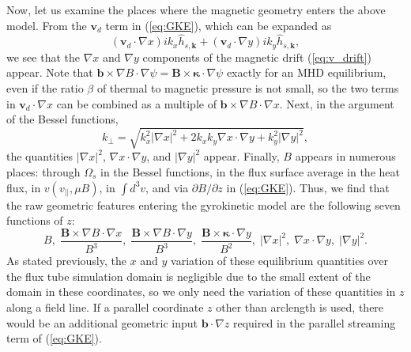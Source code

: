 \documentclass{jpp}
\begin{document}
Now, let us examine the places where the magnetic geometry enters the above model.
From the $\mathbf{v}_d$ term in (\ref{eq:GKE}), which can be expanded as
\begin{equation}
    \left(\mathbf{v}_d \cdot\nabla x \right) i k_x \hat{h}_{s,\mathbf{k}}
    + \left(\mathbf{v}_d \cdot\nabla y \right) i k_y \hat{h}_{s,\mathbf{k}},
\end{equation}
we see that the $\nabla x$ and $\nabla y$ components of the magnetic drift (\ref{eq:v_drift}) appear.
Note that $\mathbf{b}\times\nabla B\cdot\nabla\psi = \mathbf{B}\times\mathbf{\kappa}\cdot\nabla\psi$ exactly for an MHD equilibrium, even if the ratio $\beta$ of thermal to magnetic pressure is not small, so the two terms in $\mathbf{v}_d\cdot\nabla x$ can be combined as a multiple of $\mathbf{b}\times\nabla B\cdot\nabla x$.
Next, in the argument of the Bessel functions,
\begin{equation}
    k_\perp = \sqrt{k_x^2 |\nabla x|^2 + 2k_x k_y \nabla x\cdot\nabla y + k_y^2 |\nabla y|^2},
\end{equation}
the quantities $|\nabla x|^2$, $\nabla x\cdot\nabla y$, and $|\nabla y|^2$ appear.
Finally, $B$ appears in numerous places: through $\Omega_s$ in the Bessel functions, in the flux surface average in the heat flux, in $v(v_{||}, \mu B)$, in $\int d^3v$, and via $\partial B/\partial z$ in (\ref{eq:GKE}).
Thus, we find that the raw geometric features entering the gyrokinetic model are the following seven functions of $z$:
\begin{equation}
    B, 
    \;
    \frac{\mathbf{B}\times\nabla B\cdot\nabla x}{B^3},
    \;
    \frac{\mathbf{B}\times\nabla B\cdot\nabla y}{B^3},
    \;
    \frac{\mathbf{B}\times \mathbf{\kappa}\cdot\nabla y}{B^2},
    \;
    |\nabla x|^2,
    \;
    \nabla x \cdot\nabla y,
    \;
    |\nabla y|^2.
    \label{eq:raw_features}
\end{equation}
As stated previously, the $x$ and $y$ variation of these equilibrium quantities over the flux tube simulation domain is negligible due to the small extent of the domain in these coordinates, so we only need the variation of these quantities in $z$ along a field line.
If a parallel coordinate $z$ other than arclength is used, there would be an additional geometric input $\mathbf{b}\cdot\nabla z$ required in the parallel streaming term of (\ref{eq:GKE}).
\end{document}
